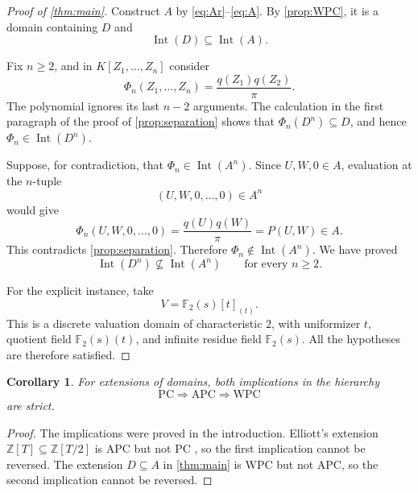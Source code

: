 \documentclass[11pt,reqno]{amsart}
\numberwithin{equation}{section}
\theoremstyle{plain}
\newtheorem{corollary}[theorem]{Corollary}
\theoremstyle{definition}
\theoremstyle{remark}
\newcommand{\Int}{\operatorname{Int}}
\newcommand{\F}{\mathbb F}
\begin{document}
\begin{proof}[Proof of \cref{thm:main}]
Construct \(A\) by \eqref{eq:Ar}--\eqref{eq:A}.  By
\cref{prop:WPC}, it is a domain containing \(D\) and
\[
 \Int(D)\subseteq\Int(A).
\]

Fix \(n\geq2\), and in \(K[Z_1,\ldots,Z_n]\) consider
\begin{equation}
 \Phi_n(Z_1,\ldots,Z_n)
   =\frac{q(Z_1)q(Z_2)}{\pi}.
 \label{eq:Phi}
\end{equation}
The polynomial ignores its last \(n-2\) arguments.  The calculation in
the first paragraph of the proof of \cref{prop:separation} shows that
\(\Phi_n(D^n)\subseteq D\), and hence
\(\Phi_n\in\Int(D^n)\).

Suppose, for contradiction, that
\(\Phi_n\in\Int(A^n)\).  Since \(U,W,0\in A\), evaluation at the
\(n\)-tuple
\[
 (U,W,0,\ldots,0)\in A^n
\]
would give
\[
 \Phi_n(U,W,0,\ldots,0)
    =\frac{q(U)q(W)}{\pi}=P(U,W)\in A.
\]
This contradicts \cref{prop:separation}.  Therefore
\(\Phi_n\notin\Int(A^n)\).  We have proved
\[
 \Int(D^n)\nsubseteq\Int(A^n)
 \qquad\text{for every }n\geq2.
\]

For the explicit instance, take
\[
 V=\F _2(s)[t]_{(t)}.
\]
This is a discrete valuation domain of characteristic \(2\), with
uniformizer \(t\), quotient field \(\F _2(s)(t)\), and infinite residue
field \(\F _2(s)\).  All the hypotheses are therefore satisfied.
\end{proof}

\begin{corollary}\label{cor:hierarchy}
For extensions of domains, both implications in the hierarchy
\[
 \mathrm{PC}\Longrightarrow\mathrm{APC}
 \Longrightarrow\mathrm{WPC}
\]
are strict.
\end{corollary}

\begin{proof}
The implications were proved in the introduction.  Elliott's extension
\(\mathbb Z[T]\subseteq\mathbb Z[T/2]\) is APC but not PC
\cite[p.~231]{Elliott2009}, so the first implication cannot be
reversed.  The extension \(D\subseteq A\) in \cref{thm:main} is WPC
but not APC, so the second implication cannot be reversed.
\end{proof}
\end{document}
